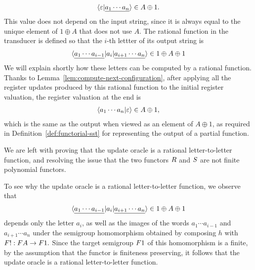 \begin{align*}
    \langle \varepsilon | \underline{a_1 \cdots a_n} \rangle \in A \oplus 1.
\end{align*}
This value does not depend on the input string, since it is always equal to the unique element of $1 \oplus A$ that does not use $A$. The rational function  in the transducer is defined so that the $i$-th lettter of its output string is 
\begin{align*}
\langle \underline{a_1 \cdots a_{i-1}}|a_i| \underline{a_{i+1} \cdots a_n} \rangle \in 1 \oplus A \oplus 1
\end{align*}
We will explain shortly how these letters  can be computed by a rational function.
Thanks to Lemma~\ref{lem:compute-next-configuration}, after applying all the register updates produced by this rational function to the initial register valuation, the register valuation at the end is 
\begin{align*}
    \langle a_1 \cdots a_n | \varepsilon \rangle \in A \oplus 1,
\end{align*}
which is the same as the output when viewed as an element of $A \oplus 1$, as required in Definition~\ref{def:functorial-sst}  for representing the output of a partial function.

We are left with proving that the update oracle is a rational letter-to-letter function, and resolving the issue that  the two functors $\functorr$ and $\functors$ are not finite polynomial functors.

To see why the update oracle is a rational letter-to-letter function, we observe that 
\begin{align*}
    \langle \underline{a_1 \cdots a_{i-1}}|a_i| \underline{a_{i+1} \cdots a_n} \rangle \in 1 \oplus A \oplus 1
    \end{align*}
depends only the letter $a_i$, as well as the images of the words  $a_1 \cdots a_{i-1}$ and $a_{i+1} \cdots a_n$ under the semigroup homomorphism obtained by composing $h$ with 
$
\functor ! : \functor A \to \functor 1.
$
Since the target semigroup $\functor 1$  of this homomorphism is a finite, by the assumption that the functor is finiteness preserving, it follows that the  update oracle is a rational letter-to-letter function.

